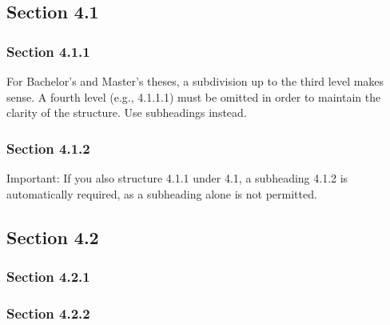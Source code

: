 \subsection{Section 4.1}


\subsubsection{Section 4.1.1}
For Bachelor's and Master's theses, a subdivision up to the third level makes sense. A fourth level (e.g., 4.1.1.1) must be omitted in order to maintain the clarity of the structure. Use subheadings instead.


\subsubsection{Section 4.1.2}
Important: If you also structure 4.1.1 under 4.1, a subheading 4.1.2 is automatically required, as a subheading alone is not permitted. 

\subsection{Section 4.2}


\subsubsection{Section 4.2.1}


\subsubsection{Section 4.2.2}
